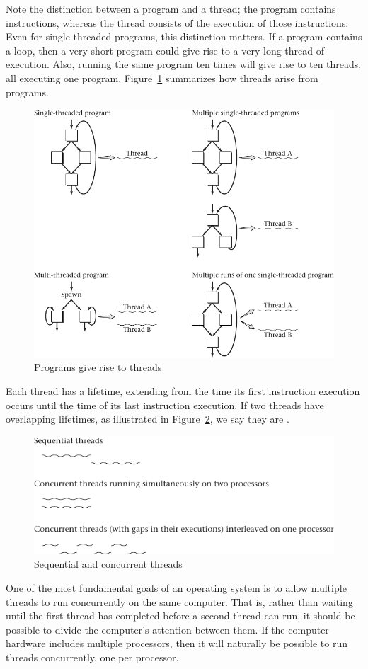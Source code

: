 Note the distinction between a program and a thread; the program
contains instructions, whereas the thread consists of the execution of
those instructions.  Even for single-threaded programs, this
distinction matters.  If a program contains a loop, then a very short
program could give rise to a very long thread of execution.  Also,
running the same program ten times will give rise to ten threads, all
executing one program.  Figure~\ref{scan-2-1} summarizes how threads
arise from programs.
\begin{figure}
\centerline{\includegraphics{hail_f0201}}
\caption{Programs give rise to threads}
\label{scan-2-1}
\end{figure}

Each thread has a lifetime, extending from the time its first
instruction execution occurs until the time of its last instruction
execution.  If two threads have overlapping lifetimes, as illustrated
in Figure~\ref{scan-2-2}, we say they are
.
\begin{figure}
\centerline{\includegraphics{hail_f0202}}
\caption{Sequential and concurrent threads}
\label{scan-2-2}
\end{figure}
One of the most fundamental goals of an operating system is to allow
multiple threads to run concurrently on the same computer.  That is,
rather than waiting until the first thread has completed before a
second thread can run, it should be possible to divide the computer's
attention between them.  If the computer hardware includes multiple
processors, then it will naturally be possible to run threads
concurrently, one per processor.



